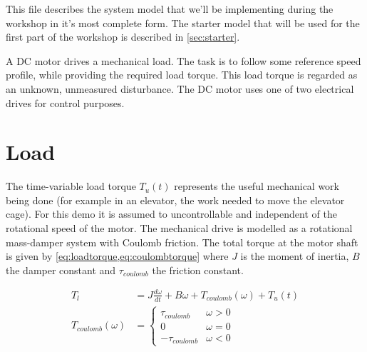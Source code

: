 \documentclass{article}
\begin{document}
This file describes the system model that we'll be implementing during the workshop in it's most complete form.
The starter model that will be used for the first part of the workshop is described in \cref{sec:starter}.

A DC motor drives a mechanical load.
The task is to follow some reference speed profile, while providing the required load torque.
This load torque is regarded as an unknown, unmeasured disturbance.
The DC motor uses one of two electrical drives for control purposes.

\section{Load}
The time-variable load torque $T_u(t)$ represents the useful mechanical work being done (for example in an elevator, the work needed to move the elevator cage).
For this demo it is assumed to uncontrollable and independent of the rotational speed of the motor.
The mechanical drive is modelled as a rotational mass-damper system with Coulomb friction.
The total torque at the motor shaft is given by \cref{eq:loadtorque,eq:coulombtorque} where $J$ is the moment of inertia, $B$ the damper constant and $\tau_{coulomb}$ the friction constant.

\begin{align}
  T_l &= J\frac{d\omega}{dt} + B \omega + T_{coulomb}(\omega) + T_{u}(t) \label{eq:loadtorque}\\
  T_{coulomb}(\omega) &= \begin{cases}
    \tau_{coulomb} & \omega > 0\\
    0 & \omega = 0\\
    -\tau_{coulomb} & \omega < 0
  \end{cases} \label{eq:coulombtorque}
\end{align}
\end{document}
